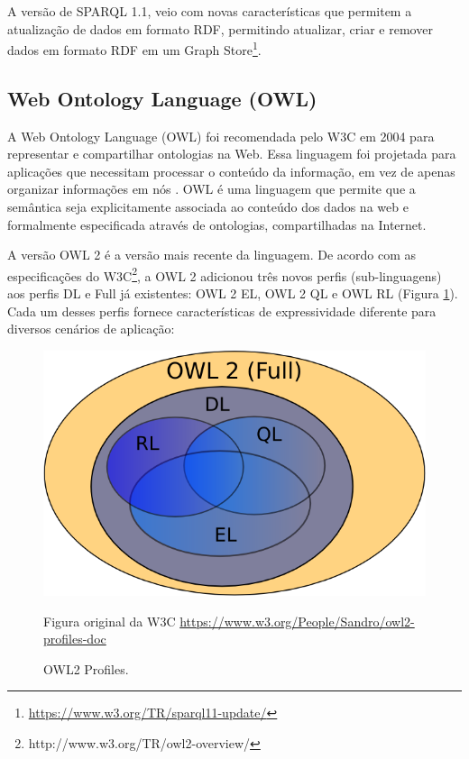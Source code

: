 %
A versão de SPARQL 1.1, veio com novas características que permitem
a atualização de dados em formato \foreignlanguage{english}{RDF},
permitindo atualizar, criar e remover dados em formato \foreignlanguage{english}{RDF}
em um \foreignlanguage{english}{Graph Store}\footnote{\url{https://www.w3.org/TR/sparql11-update/}}.
%

\subsection*{Web Ontology Language\foreignlanguage{brazil}{ (}OWL\foreignlanguage{brazil}{)}}

%
A \foreignlanguage{english}{Web Ontology Language} (\foreignlanguage{english}{OWL})
foi recomendada pelo W3C em 2004 para representar e compartilhar ontologias
na Web. Essa linguagem foi projetada para aplicações que necessitam
processar o conteúdo da informação, em vez de apenas organizar informações
em nós \citep{mcguinness2004owl}. \foreignlanguage{english}{OWL}
é uma linguagem que permite que a semântica seja explicitamente associada
ao conteúdo dos dados na web e formalmente especificada através de
ontologias, compartilhadas na Internet. 

A versão \foreignlanguage{english}{OWL} 2 é a versão mais recente
da linguagem. De acordo com as especificações do W3C\footnote{http://www.w3.org/TR/owl2-overview/},
a \foreignlanguage{english}{OWL 2} adicionou três novos perfis (\foreignlanguage{english}{sub-linguagens})
aos perfis DL e \foreignlanguage{english}{Full} já existentes: \foreignlanguage{english}{OWL
2} EL,\foreignlanguage{english}{ OWL 2 QL} e \foreignlanguage{english}{OWL
RL} (Figura \ref{fig:OWL2-Profiles}). Cada um desses perfis fornece
características de expressividade diferente para diversos cenários
de aplicação:

\begin{figure}[H]
\begin{centering}
\includegraphics[width=0.6\columnwidth]{figures/owl2Profiles}
\par\end{centering}
\caption{OWL2 Profiles.\label{fig:OWL2-Profiles}}

Figura original da W3C \url{https://www.w3.org/People/Sandro/owl2-profiles-doc}
\end{figure}
 
